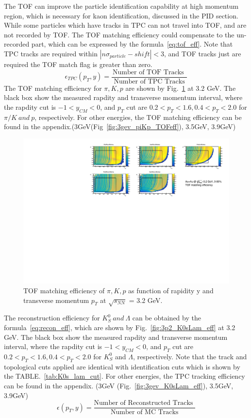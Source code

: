 The TOF can improve the particle identification capability at high momentum region, 
which is necessary for kaon identification, discussed in the PID section.
While some particles which have tracks in TPC can not travel into TOF, and are not recorded by TOF.
The TOF matching efficiency could compensate to the un-recorded part, 
which can be expressed by the formula~\ref{eq:tof_eff}. Note that TPC tracks are required within $|n\sigma_{particle}-shift|<3$,
and TOF tracks just are required the TOF match flag is greater than zero.
\begin{equation}
    \epsilon_{TPC}\left(p_T, y\right)=\frac{\text {Number of TOF Tracks }}{\text { Number of TPC Tracks }}
\label{eq:tof_eff}
\end{equation}
The TOF matching efficiency for $\pi, K, p$ are shown by Fig.~\ref{fig:3p2_piKp_TOFeff} at 3.2 GeV. 
The black box show the measured rapdity and transverse momentum interval, where the rapdity cut is $-1<y_{CM}<0$, 
and $p_T$ cut are $0.2<p_T<1.6, 0.4<p_T<2.0$ for $\pi/K ~and~ p$, respectively. 
For other energies, the TOF matching efficiency can be found in the appendix.(3GeV(Fig~\ref{fig:3gev_piKp_TOFeff}), 3.5GeV, 3.9GeV)
\begin{figure}[hbt!]
\centering
\includegraphics[width=0.65\linewidth]{figures/chapter02/3p2gev_TOF_eff.pdf}
\caption{TOF matching efficiency of $\pi, K, p$ as function of rapidity y and transverse momentum $p_T$ at $\sqrt{s_{NN}}$ = 3.2 GeV.}
\label{fig:3p2_piKp_TOFeff}
\end{figure}

The reconstruction efficiency for $K^{0}_{S}~and~ \Lambda$ can be obtained by the formula~\ref{eq:recon_eff},
which are shown by Fig.~\ref{fig:3p2_K0sLam_eff} at 3.2 GeV. The black box show the measured rapdity and transverse momentum interval, 
where the rapdity cut is $-1<y_{CM}<0$, and $p_T$ cut are $0.2<p_T<1.6, 0.4<p_T<2.0$ for $K^{0}_{S}$ and $\Lambda$, respectively. 
Note that the track and topological cuts applied are identical with identification cuts which is shown by the TABLE.~\ref{tab:K0s_lam_cut}.
For other energies, the TPC tracking efficiency can be found in the appendix. (3GeV (Fig.~\ref{fig:3gev_K0sLam_eff}), 3.5GeV, 3.9GeV)
\begin{equation}
    \epsilon\left(p_T, y\right)=\frac{\text {Number of Reconstructed Tracks }}{\text { Number of MC Tracks }}
\label{eq:recon_eff}
\end{equation}

